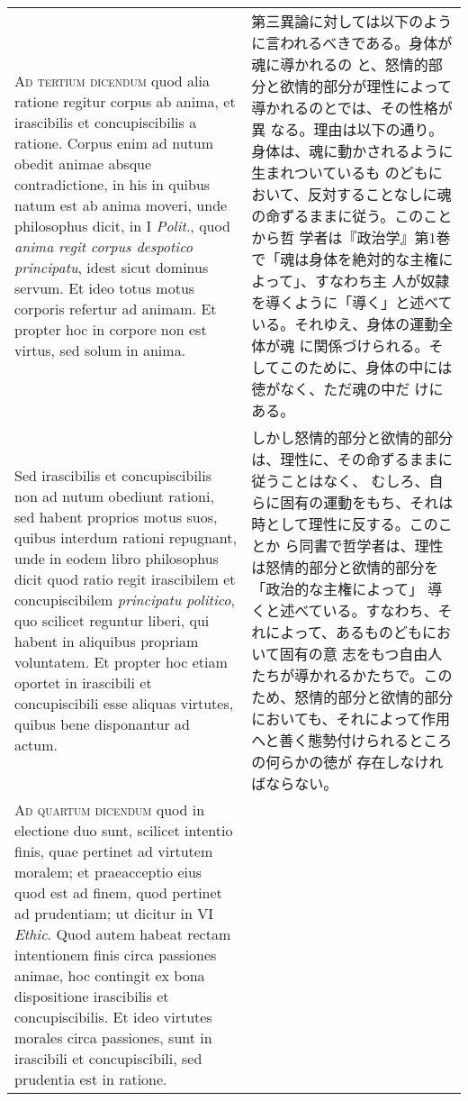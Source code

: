 \documentclass[10pt]{jsarticle}
\begin{document}
\begin{longtable}{p{21em}p{21em}}
\\

{\scshape Ad tertium dicendum} quod alia ratione regitur corpus ab
anima, et irascibilis et concupiscibilis a ratione. Corpus enim ad
nutum obedit animae absque contradictione, in his in quibus natum est
ab anima moveri, unde philosophus dicit, in I {\itshape Polit}., quod
{\itshape anima regit corpus despotico principatu}, idest sicut
dominus servum. Et ideo totus motus corporis refertur ad animam. Et
propter hoc in corpore non est virtus, sed solum in anima. 

&

第三異論に対しては以下のように言われるべきである。身体が魂に導かれるの
と、怒情的部分と欲情的部分が理性によって導かれるのとでは、その性格が異
なる。理由は以下の通り。身体は、魂に動かされるように生まれついているも
のどもにおいて、反対することなしに魂の命ずるままに従う。このことから哲
学者は『政治学』第1巻で「魂は身体を絶対的な主権によって」、すなわち主
人が奴隷を導くように「導く」と述べている。それゆえ、身体の運動全体が魂
に関係づけられる。そしてこのために、身体の中には徳がなく、ただ魂の中だ
けにある。

\\

Sed
irascibilis et concupiscibilis non ad nutum obediunt rationi, sed
habent proprios motus suos, quibus interdum rationi repugnant, unde in
eodem libro philosophus dicit quod ratio regit irascibilem et
concupiscibilem {\itshape principatu politico}, quo scilicet reguntur
liberi, qui habent in aliquibus propriam voluntatem. Et propter hoc
etiam oportet in irascibili et concupiscibili esse aliquas virtutes,
quibus bene disponantur ad actum.

&

しかし怒情的部分と欲情的部分は、理性に、その命ずるままに従うことはなく、
むしろ、自らに固有の運動をもち、それは時として理性に反する。このことか
ら同書で哲学者は、理性は怒情的部分と欲情的部分を「政治的な主権によって」
導くと述べている。すなわち、それによって、あるものどもにおいて固有の意
志をもつ自由人たちが導かれるかたちで。このため、怒情的部分と欲情的部分
においても、それによって作用へと善く態勢付けられるところの何らかの徳が
存在しなければならない。

\\

{\scshape Ad quartum dicendum} quod in electione duo sunt, scilicet
intentio finis, quae pertinet ad virtutem moralem; et praeacceptio
eius quod est ad finem, quod pertinet ad prudentiam; ut dicitur in VI
{\itshape Ethic}. Quod autem habeat rectam intentionem finis circa
passiones animae, hoc contingit ex bona dispositione irascibilis et
concupiscibilis. Et ideo virtutes morales circa passiones, sunt in
irascibili et concupiscibili, sed prudentia est in ratione.


\end{longtable}
\end{document}
